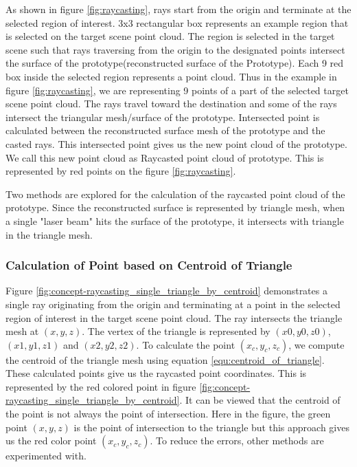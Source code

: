 As shown in figure \ref{fig:raycasting}, rays start from the origin and terminate at the selected region of interest. 3x3 rectangular box represents an example region that is selected on the target scene point cloud. The region is selected in the target scene such that rays traversing from the origin to the designated points intersect the surface of the prototype(reconstructed surface of the Prototype).
Each 9 red box inside the selected region represents a point cloud. Thus in the example in figure \ref{fig:raycasting}, we are representing 9 points of a part of the selected target scene point cloud. The rays travel toward the destination and some of the rays intersect the triangular mesh/surface of the prototype. Intersected point is calculated between the reconstructed surface mesh of the prototype and the casted rays. This intersected point gives us the new point cloud of the prototype. We call this new point cloud as Raycasted point cloud of prototype. This is represented by red points on the figure \ref{fig:raycasting}.

Two methods are explored for the calculation of the raycasted point cloud of the prototype. Since the reconstructed surface is represented by triangle mesh, when a single "laser beam" hits the surface of the prototype, it intersects with triangle in the triangle mesh. 

\subsubsection{Calculation of Point based on Centroid of Triangle}

Figure \ref{fig:concept-raycasting_single_triangle_by_centroid} demonstrates a single ray originating from the origin and terminating at a point in the selected region of interest in the target scene point cloud. The ray intersects the triangle mesh at \((x, y, z)\). The vertex of the triangle is represented by \((x0, y0, z0)\), \((x1, y1, z1)\) and \((x2, y2, z2)\). To calculate the point \((x_c, y_c, z_c)\), we compute the centroid of the triangle mesh using equation \ref{equ:centroid_of_triangle}. These calculated points give us the raycasted point coordinates. This is represented by the red colored point in figure \ref{fig:concept-raycasting_single_triangle_by_centroid}. It can be viewed that the centroid of the point is not always the point of intersection. Here in the figure, the green point \((x, y, z)\) is the point of intersection to the triangle but this approach gives us the red color point \((x_c, y_c, z_c)\). To reduce the errors, other methods are experimented with.

